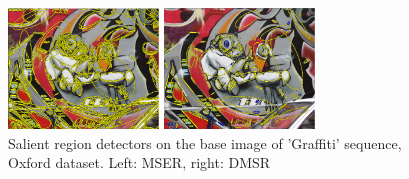 \documentclass{article}
\begin{document}
\begin{figure}[htb]

\begin{minipage}[b]{.49\linewidth}
  \centering
  \centerline{\includegraphics[width=4.0cm]{./Figs/mserGraffiti1}}
\end{minipage}
\hfill
\begin{minipage}[b]{0.49\linewidth}
  \centering
  \centerline{\includegraphics[width=4.0cm]{./Figs/dmsrGraffiti1}}
\end{minipage}
\vspace{-0.25cm}
\caption{Salient region detectors on the base image of 'Graffiti' sequence, Oxford dataset. Left: MSER, right: DMSR}
\label{fig:det_graffiti}
%
\end{figure}
\end{document}
